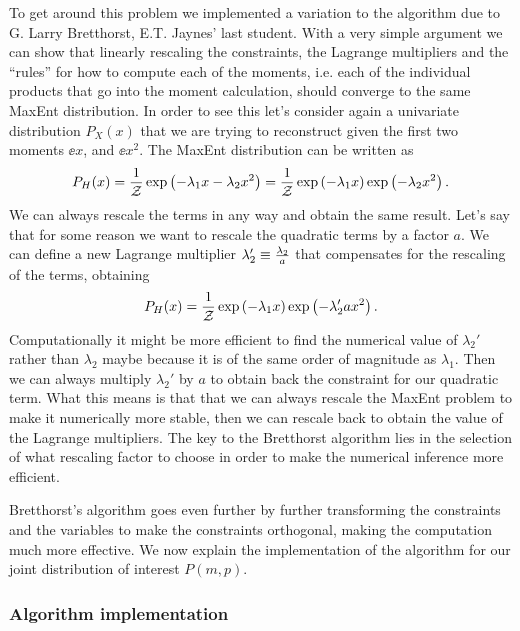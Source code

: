 To get around this problem we implemented a variation to the algorithm due to G.
Larry Bretthorst, E.T. Jaynes' last student. With a very simple argument we can
show that linearly rescaling the constraints, the Lagrange multipliers and the
``rules'' for how to compute each of the moments, i.e. each of the individual
products that go into the moment calculation, should converge to the same MaxEnt
distribution. In order to see this let's consider again a univariate
distribution $P_X(x)$ that we are trying to reconstruct given the first two
moments $\ee{x}$, and $\ee{x^2}$. The MaxEnt distribution can be written as
\begin{equation}
  P_H(x) = {1 \over \mathcal{Z}}
  \exp \left(- \lambda_1 x - \lambda_2 x^2 \right) =
  {1 \over \mathcal{Z}}
  \exp \left(- \lambda_1 x \right) \exp \left( - \lambda_2 x^2 \right).
\end{equation}
We can always rescale the terms in any way and obtain the same result. Let's say
that for some reason we want to rescale the quadratic terms by a factor $a$. We
can define a new Lagrange multiplier $\lambda_2' \equiv {\lambda_2 \over a}$
that compensates for the rescaling of the terms, obtaining
\begin{equation}
  P_H(x) = {1 \over \mathcal{Z}}
  \exp \left(- \lambda_1 x \right) \exp \left( - \lambda_2' ax^2 \right).
\end{equation}
Computationally it might be more efficient to find the numerical value of
$\lambda_2'$ rather than $\lambda_2$ maybe because it is of the same order of
magnitude as $\lambda_1$. Then we can always multiply $\lambda_2'$ by $a$ to
obtain back the constraint for our quadratic term. What this means is that that
we can always rescale the MaxEnt problem to make it numerically more stable,
then we can rescale back to obtain the value of the Lagrange multipliers. The
key to the Bretthorst algorithm lies in the selection of what rescaling factor
to choose in order to make the numerical inference more efficient.

Bretthorst's algorithm goes even further by further transforming the constraints
and the variables to make the constraints orthogonal, making the computation
much more effective. We now explain the implementation of the algorithm for our
joint distribution of interest $P(m, p)$.

\subsubsection{Algorithm implementation}

